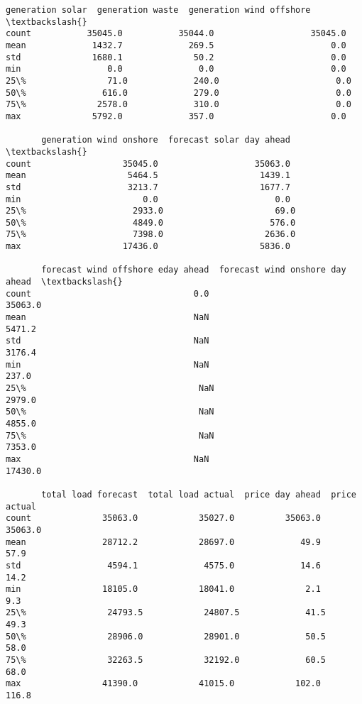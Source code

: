 \documentclass[11pt]{article}
\begin{document}
\begin{tcolorbox}[breakable, size=fbox, boxrule=.5pt, pad at break*=1mm, opacityfill=0]
\begin{Verbatim}[commandchars=\\\{\}]
       generation solar  generation waste  generation wind offshore  \textbackslash{}
count           35045.0           35044.0                   35045.0
mean             1432.7             269.5                       0.0
std              1680.1              50.2                       0.0
min                 0.0               0.0                       0.0
25\%                71.0             240.0                       0.0
50\%               616.0             279.0                       0.0
75\%              2578.0             310.0                       0.0
max              5792.0             357.0                       0.0

       generation wind onshore  forecast solar day ahead  \textbackslash{}
count                  35045.0                   35063.0
mean                    5464.5                    1439.1
std                     3213.7                    1677.7
min                        0.0                       0.0
25\%                     2933.0                      69.0
50\%                     4849.0                     576.0
75\%                     7398.0                    2636.0
max                    17436.0                    5836.0

       forecast wind offshore eday ahead  forecast wind onshore day ahead  \textbackslash{}
count                                0.0                          35063.0
mean                                 NaN                           5471.2
std                                  NaN                           3176.4
min                                  NaN                            237.0
25\%                                  NaN                           2979.0
50\%                                  NaN                           4855.0
75\%                                  NaN                           7353.0
max                                  NaN                          17430.0

       total load forecast  total load actual  price day ahead  price actual
count              35063.0            35027.0          35063.0       35063.0
mean               28712.2            28697.0             49.9          57.9
std                 4594.1             4575.0             14.6          14.2
min                18105.0            18041.0              2.1           9.3
25\%                24793.5            24807.5             41.5          49.3
50\%                28906.0            28901.0             50.5          58.0
75\%                32263.5            32192.0             60.5          68.0
max                41390.0            41015.0            102.0         116.8
\end{Verbatim}
\end{tcolorbox}
        
\end{document}
